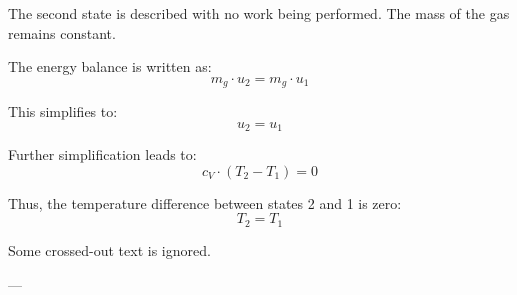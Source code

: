The second state is described with no work being performed. The mass of the gas remains constant.  

The energy balance is written as:  
\[
m_g \cdot u_2 = m_g \cdot u_1
\]

This simplifies to:  
\[
u_2 = u_1
\]

Further simplification leads to:  
\[
c_V \cdot (T_2 - T_1) = 0
\]

Thus, the temperature difference between states 2 and 1 is zero:  
\[
T_2 = T_1
\]  

Some crossed-out text is ignored.  

---